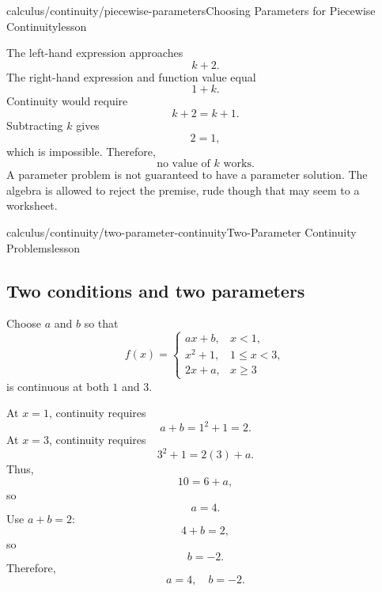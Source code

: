 \begin{webpage}{calculus/continuity/piecewise-parameters}{Choosing Parameters for Piecewise Continuity}{lesson}
\begin{bgexample}[title={Exam-level: no parameter works}]
\begin{bgsolution}
The left-hand expression approaches
\[
  k+2.
\]
The right-hand expression and function value equal
\[
  1+k.
\]
Continuity would require
\[
  k+2=k+1.
\]
Subtracting \(k\) gives
\[
  2=1,
\]
which is impossible. Therefore,
\[
  \boxed{\text{no value of }k\text{ works}}.
\]
A parameter problem is not guaranteed to have a parameter solution. The algebra is allowed to reject the premise, rude though that may seem to a worksheet.
\end{bgsolution}
\end{bgexample}
\end{webpage}

\begin{webpage}{calculus/continuity/two-parameter-continuity}{Two-Parameter Continuity Problems}{lesson}
\subsection{Two conditions and two parameters}

\begin{bgexample}[title={Solve a two-parameter continuity system}]
Choose \(a\) and \(b\) so that
\[
  f(x)=
  \begin{cases}
    ax+b,&x<1,\\
    x^2+1,&1\le x<3,\\
    2x+a,&x\ge3
  \end{cases}
\]
is continuous at both \(1\) and \(3\).

\begin{bgsolution}
At \(x=1\), continuity requires
\[
  a+b=1^2+1=2.
\]
At \(x=3\), continuity requires
\[
  3^2+1=2(3)+a.
\]
Thus,
\[
  10=6+a,
\]
so
\[
  a=4.
\]
Use \(a+b=2\):
\[
  4+b=2,
\]
so
\[
  b=-2.
\]
Therefore,
\[
  \boxed{a=4,\quad b=-2}.
\]
\end{bgsolution}
\end{bgexample}
\end{webpage}

